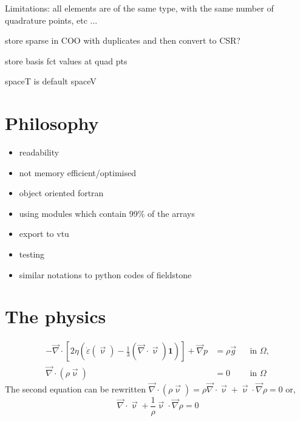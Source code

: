 Limitations: all elements are of the same type, with the same number of 
quadrature points, etc ...

store sparse in COO with duplicates and then convert to CSR?

store basis fct values at quad pts

spaceT is default spaceV

\section{Philosophy}
\begin{itemize}
\item readability
\item not memory efficient/optimised
\item object oriented fortran
\item using modules which contain 99\% of the arrays
\item export to vtu 
\item testing
\item similar notations to python codes of fieldstone
\end{itemize}

\section{The physics}

\begin{align}
-\vec\nabla \cdot \left[ 2\eta \left(\dot\varepsilon(\vec \upnu) - \frac{1}{3}(\vec\nabla \cdot \vec{\upnu}) \mathbf 1\right) \right] + \vec\nabla p &=  \rho \vec{g}
  &
  & \textrm{in $\Omega$},
  \\  
  \vec\nabla \cdot (\rho \vec{\upnu}) &= 0
  &
  & \textrm{in $\Omega$}
\end{align}
The second equation can be rewritten 
$\vec\nabla \cdot (\rho \vec{\upnu}) =  \rho \vec\nabla \cdot \vec{\upnu} + \vec{\upnu} \cdot {\vec \nabla} \rho=0$
or, 
\[
\vec\nabla \cdot \vec{\upnu} + \frac{1}{\rho} \vec{\upnu} \cdot {\vec \nabla}\rho=0
\]

